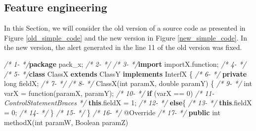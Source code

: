\documentclass[
]{article}
\newenvironment{Shaded}{\begin{snugshade}}{\end{snugshade}}
\newcommand{\AttributeTok}[1]{\textcolor[rgb]{0.77,0.63,0.00}{#1}}
\newcommand{\BuiltInTok}[1]{#1}
\newcommand{\CommentTok}[1]{\textcolor[rgb]{0.56,0.35,0.01}{\textit{#1}}}
\newcommand{\DataTypeTok}[1]{\textcolor[rgb]{0.13,0.29,0.53}{#1}}
\newcommand{\DecValTok}[1]{\textcolor[rgb]{0.00,0.00,0.81}{#1}}
\newcommand{\FunctionTok}[1]{\textcolor[rgb]{0.00,0.00,0.00}{#1}}
\newcommand{\ImportTok}[1]{#1}
\newcommand{\KeywordTok}[1]{\textcolor[rgb]{0.13,0.29,0.53}{\textbf{#1}}}
\newcommand{\NormalTok}[1]{#1}
\begin{document}
\subsection{Feature engineering} \label{feature_creation}

In this Section, we will consider the old version of a source code as presented in Figure
\ref{old_simple_code} and the new version in Figure
\ref{new_simple_code}. In the new version, the alert generated in the
line 11 of the old version was fixed.

\newpage

\small

\begin{Shaded}
\begin{Highlighting}[]
\CommentTok{/*  1-                                   */}\KeywordTok{package}\ImportTok{ pack_x;}
\CommentTok{/*  2-                                   */}  
\CommentTok{/*  3-                                   */}\KeywordTok{import}\ImportTok{ importX.function;}
\CommentTok{/*  4-                                   */}
\CommentTok{/*  5-                                   */}\KeywordTok{class}\NormalTok{ ClassX }\KeywordTok{extends}\NormalTok{ ClassY }\KeywordTok{implements}\NormalTok{ InterfX \{}
\CommentTok{/*  6-                                   */}    \KeywordTok{private} \DataTypeTok{long}\NormalTok{ fieldX;}
\CommentTok{/*  7-                                   */}    
\CommentTok{/*  8-                                   */}    \FunctionTok{ClassX}\NormalTok{(}\DataTypeTok{int}\NormalTok{ paramX, }\DataTypeTok{double}\NormalTok{ paramY) \{      }
\CommentTok{/*  9-                                   */}        \DataTypeTok{int}\NormalTok{ varX = }\FunctionTok{function}\NormalTok{(paramX, paramY);     }
\CommentTok{/* 10-                                   */}        \KeywordTok{if}\NormalTok{ (varX == }\DecValTok{0}\NormalTok{)}
\CommentTok{/* 11-ControlStatementBraces             */}            \KeywordTok{this}\NormalTok{.}\FunctionTok{fieldX}\NormalTok{ = }\DecValTok{1}\NormalTok{;}
\CommentTok{/* 12-                                   */}        \KeywordTok{else}\NormalTok{\{}
\CommentTok{/* 13-                                   */}            \KeywordTok{this}\NormalTok{.}\FunctionTok{fieldX}\NormalTok{ = }\DecValTok{0}\NormalTok{;}
\CommentTok{/* 14-                                   */}\NormalTok{     \}}
\CommentTok{/* 15-                                   */}\NormalTok{    \}}
\CommentTok{/* 16-                                   */}    \AttributeTok{@Override}
\CommentTok{/* 17-                                   */}    \KeywordTok{public} \DataTypeTok{int} \FunctionTok{methodX}\NormalTok{(}\DataTypeTok{int}\NormalTok{ paramW, }\BuiltInTok{Boolean}\NormalTok{ paramZ)}

\end{Highlighting}
\end{Shaded}
\end{document}
